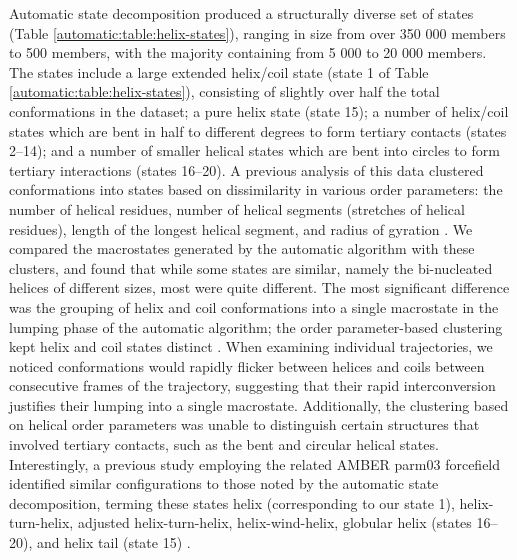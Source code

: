 Automatic state decomposition produced a structurally diverse set of states (Table \ref{automatic:table:helix-states}), ranging in size from over 350 000 members to 500 members, with the majority containing from 5 000 to 20 000 members.  
The states include a large extended helix/coil state (state 1 of Table \ref{automatic:table:helix-states}), consisting of slightly over half the total conformations in the dataset; a pure helix state (state 15); a number of helix/coil states which are bent in half to different degrees to form tertiary contacts (states 2--14); and a number of smaller helical states which are bent into circles to form tertiary interactions (states 16--20). 
A previous analysis of this data clustered conformations into states based on dissimilarity in various order parameters: the number of helical residues, number of helical segments (stretches of helical residues), length of the longest helical segment, and radius of gyration \cite{sorin:2005b}.
We compared the macrostates generated by the automatic algorithm with these clusters, and found that while some states are similar, namely the bi-nucleated helices of different sizes, most were quite different.
The most significant difference was the grouping of helix and coil conformations into a single macrostate in the lumping phase of the automatic algorithm; the order parameter-based clustering kept helix and coil states distinct \cite{sorin:2005b}.
When examining individual trajectories, we noticed conformations would rapidly flicker between helices and coils between consecutive frames of the trajectory, suggesting that their rapid interconversion justifies their lumping into a single macrostate.
Additionally, the clustering based on helical order parameters was unable to distinguish certain structures that involved tertiary contacts, such as the bent and circular helical states.
Interestingly, a previous study employing the related AMBER parm03 forcefield \cite{duan:2003a} identified similar configurations to those noted by the automatic state decomposition, terming these states helix (corresponding to our state 1), helix-turn-helix, adjusted helix-turn-helix, helix-wind-helix, globular helix (states 16--20), and helix tail (state 15) \cite{duan:jpcb:2004}.


